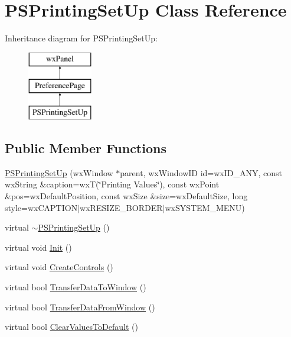 \hypertarget{a00121}{\section{P\-S\-Printing\-Set\-Up Class Reference}
\label{a00121}
}
Inheritance diagram for P\-S\-Printing\-Set\-Up\-:\begin{figure}[H]
\begin{center}
\leavevmode
\includegraphics[height=3.000000cm]{a00121}
\end{center}
\end{figure}
\subsection*{Public Member Functions}
\begin{DoxyCompactItemize}
\item 
\hyperlink{a00121_adca45bf6d0f5b6c50e679e41c4b8719e}{P\-S\-Printing\-Set\-Up} (wx\-Window $\ast$parent, wx\-Window\-I\-D id=wx\-I\-D\-\_\-\-A\-N\-Y, const wx\-String \&caption=wx\-T(\char`\"{}Printing Values\char`\"{}), const wx\-Point \&pos=wx\-Default\-Position, const wx\-Size \&size=wx\-Default\-Size, long style=wx\-C\-A\-P\-T\-I\-O\-N$\vert$wx\-R\-E\-S\-I\-Z\-E\-\_\-\-B\-O\-R\-D\-E\-R$\vert$wx\-S\-Y\-S\-T\-E\-M\-\_\-\-M\-E\-N\-U)
\item 
virtual \hyperlink{a00121_a315a8de1176e980d03f84f1be58e9daf}{$\sim$\-P\-S\-Printing\-Set\-Up} ()
\item 
virtual void \hyperlink{a00121_a67d08216ffdda46af22cc9edef4f1429}{Init} ()
\item 
virtual void \hyperlink{a00121_a567f7957ee4d2cc268502fc350787646}{Create\-Controls} ()
\item 
virtual bool \hyperlink{a00121_a1ee957cf9840d2fc21e313f1b16e2e23}{Transfer\-Data\-To\-Window} ()
\item 
virtual bool \hyperlink{a00121_ab6ceae986a8305981e80a4eae549dc5b}{Transfer\-Data\-From\-Window} ()
\item 
virtual bool \hyperlink{a00121_acb122e24f632f4083a4a1a76472617b7}{Clear\-Values\-To\-Default} ()
\end{DoxyCompactItemize}
